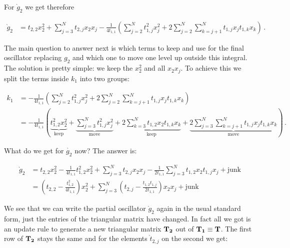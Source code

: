 \documentclass[a4paper,10pt]{article}
\begin{document}
For $\grave{g}_2$ we get therefore

\begin{equation}
\begin{split}
  \grave{g}_2
  & = t_{2,2} x_2^2 + \sum_{j=3}^{N} t_{2,j} x_2 x_j
      - \frac{1}{4 t_{1,1}} \left( \sum_{j=2}^{N} t_{1,j}^2 x_j^2
                               + 2 \sum_{j=2}^{N} \sum_{k=j+1}^{N} t_{1,j} x_j t_{1,k} x_k
                            \right) \,.
\end{split}
\end{equation}

The main question to answer next is which terms to keep and use
for the final oscillator replacing $g_2$ and which one to move
one level up outside this integral. The solution is pretty simple:
we keep the $x_2^2$ and all $x_2 x_j$. To achieve this we split
the terms inside $k_1$ into two groups:

\begin{equation}
\begin{split}
 k_1 & = - \frac{1}{4 t_{1,1}}
         \left(
           \sum_{j=2}^{N} t_{1,j}^2 x_j^2
           + 2 \sum_{j=2}^{N} \sum_{k=j+1}^{N} t_{1,j} x_j t_{1,k} x_k
         \right) \\
     & = - \frac{1}{4 t_{1,1}}
         \left(
           \underbrace{t_{1,2}^2 x_2^2}_{\text{keep}}
           +
           \underbrace{\sum_{j=3}^{N} t_{1,j}^2 x_j^2}_{\text{move}}
           +
           \underbrace{2 \sum_{k=3}^{N} t_{1,2} x_2 t_{1,k} x_k}_{\text{keep}}
           +
           \underbrace{2 \sum_{j=3}^{N} \sum_{k=j+1}^{N} t_{1,j} x_j t_{1,k} x_k}_{\text{move}}
         \right) \,.
\end{split}
\end{equation}

What do we get for $\grave{g_2}$ now? The answer is:

\begin{equation}
\begin{split}
  \grave{g}_2
  & = t_{2,2} x_2^2 - \frac{1}{4 t_{1,1}} t_{1,2}^2 x_2^2
    + \sum_{j=3}^{N} t_{2,j} x_2 x_j - \frac{1}{2 t_{1,1}} \sum_{j=3}^{N} t_{1,2} x_2 t_{1,j} x_j
    + \text{junk} \\
  & = \left(t_{2,2} - \frac{t_{1,2}^2}{4 t_{1,1}}\right) x_2^2
    + \sum_{j=3}^{N} \left(t_{2,j} - \frac{t_{1,2} t_{1,j}}{2 t_{1,1}}\right) x_2 x_j
    + \text{junk}
\end{split}
\end{equation}

We see that we can write the partial oscillator $\grave{g}_2$ again
in the usual standard form, just the entries of the triangular matrix
have changed. In fact all we got is an update rule to generate a new
triangular matrix $\mathbf{T_2}$ out of $\mathbf{T_1} \equiv \mathbf{T}$. The first
row of $\mathbf{T_2}$ stays the same and for the elements $\grave{t}_{2,j}$ on
the second we get:
\end{document}
